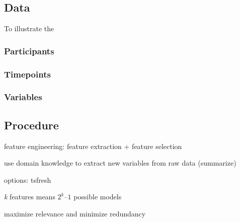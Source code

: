 \subsection{Data}

To illustrate the

\subsubsection{Participants}

\subsubsection{Timepoints}

\subsubsection{Variables}

\subsection{Procedure}

feature engineering: feature extraction + feature selection

use domain knowledge to extract new variables from raw data (summarize)

options: tsfresh \citep[][]{christ2018}

\textit{k} features means \(2^k – 1\) possible models

maximize relevance and minimize redundancy
